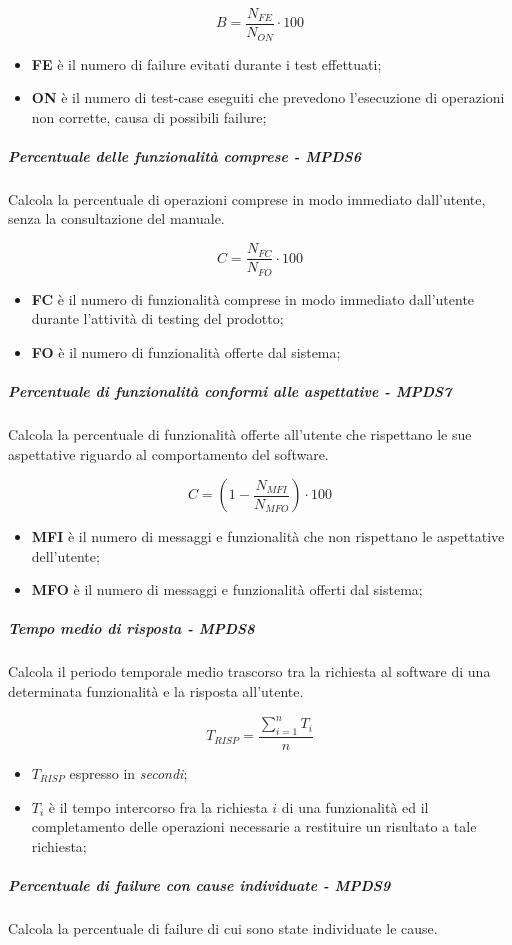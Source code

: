 \begin{equation*}B=\frac{N_{FE}}{N_{ON}} \cdot 100 \end{equation*}
\begin{itemize}
	\item \textbf{FE} è il numero di failure evitati durante i test effettuati;
	\item \textbf{ON} è il numero di test-case eseguiti che prevedono l'esecuzione di operazioni non corrette, causa di possibili failure;
\end{itemize}
\subparagraph{Percentuale delle funzionalità comprese  - MPDS6}
Calcola la percentuale di operazioni comprese in modo immediato dall'utente, senza la consultazione del manuale.

\begin{equation*}C=\frac{N_{FC}}{N_{FO}} \cdot 100\end{equation*}
\begin{itemize}
	\item \textbf{FC} è il numero di funzionalità comprese in modo immediato dall'utente durante l'attività di testing del prodotto;
	\item \textbf{FO} è il numero di funzionalità offerte dal sistema;
\end{itemize}
\subparagraph{Percentuale di funzionalità conformi alle aspettative - MPDS7}
Calcola la percentuale di funzionalità offerte all'utente che rispettano le sue aspettative riguardo al comportamento del software.

\begin{equation*}C=(1-\frac{N_{MFI}}{N_{MFO}}) \cdot 100\end{equation*}
\begin{itemize}
	\item \textbf{MFI} è il numero di messaggi e funzionalità che non rispettano le aspettative dell'utente;
	\item \textbf{MFO} è il numero di messaggi e funzionalità offerti dal sistema;
\end{itemize}
\subparagraph{Tempo medio di risposta - MPDS8}
Calcola il periodo temporale medio trascorso tra la richiesta al software di una determinata funzionalità e la risposta all’utente.

\begin{equation*}T_{RISP} = \frac{\sum_{i=1}^{n} T_{i}}{n}\end{equation*}
\begin{itemize}
	\item \textbf{$T_{RISP}$} espresso in \textit{secondi};
	\item \textbf{$T_{i}$} è il tempo intercorso fra la richiesta $i$ di una funzionalità ed il completamento delle operazioni necessarie a restituire un risultato a tale richiesta;
\end{itemize}
\subparagraph{Percentuale di failure con cause individuate - MPDS9}
Calcola la percentuale di failure di cui sono state individuate le cause.

